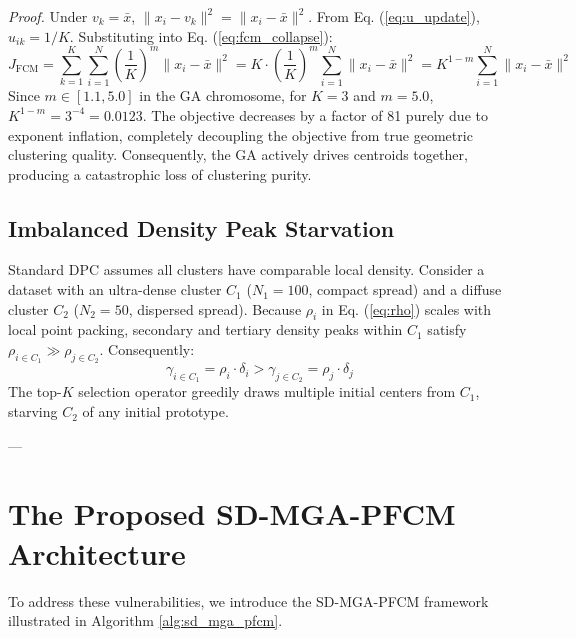 \documentclass[preprint,12pt]{elsarticle}
\begin{document}
\textit{Proof.} Under $v_k = \bar{x}$, $\|x_i - v_k\|^2 = \|x_i - \bar{x}\|^2$. From Eq. (\ref{eq:u_update}), $u_{ik} = 1/K$. Substituting into Eq. (\ref{eq:fcm_collapse}):
\begin{equation}
J_{\text{FCM}} = \sum_{k=1}^K \sum_{i=1}^N \left(\frac{1}{K}\right)^m \|x_i - \bar{x}\|^2 = K \cdot \left(\frac{1}{K}\right)^m \sum_{i=1}^N \|x_i - \bar{x}\|^2 = K^{1-m} \sum_{i=1}^N \|x_i - \bar{x}\|^2
\end{equation}
Since $m \in [1.1, 5.0]$ in the GA chromosome, for $K=3$ and $m=5.0$, $K^{1-m} = 3^{-4} = 0.0123$. The objective decreases by a factor of 81 purely due to exponent inflation, completely decoupling the objective from true geometric clustering quality. Consequently, the GA actively drives centroids together, producing a catastrophic loss of clustering purity.

\subsection{Imbalanced Density Peak Starvation}
Standard DPC assumes all clusters have comparable local density. Consider a dataset with an ultra-dense cluster $C_1$ ($N_1 = 100$, compact spread) and a diffuse cluster $C_2$ ($N_2 = 50$, dispersed spread). Because $\rho_i$ in Eq. (\ref{eq:rho}) scales with local point packing, secondary and tertiary density peaks within $C_1$ satisfy $\rho_{i \in C_1} \gg \rho_{j \in C_2}$. Consequently:
\begin{equation}
\gamma_{i \in C_1} = \rho_i \cdot \delta_i > \gamma_{j \in C_2} = \rho_j \cdot \delta_j
\end{equation}
The top-$K$ selection operator greedily draws multiple initial centers from $C_1$, starving $C_2$ of any initial prototype.

---

\section{The Proposed SD-MGA-PFCM Architecture}
\label{sec:proposed}

To address these vulnerabilities, we introduce the SD-MGA-PFCM framework illustrated in Algorithm \ref{alg:sd_mga_pfcm}.
\end{document}
